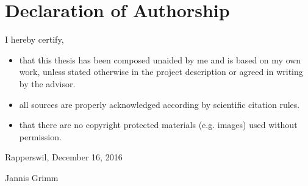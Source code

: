 \chapter{Declaration of Authorship}

I hereby certify,

\begin{itemize}
  \item that this thesis has been composed unaided by me and is based on my own
  work, unless stated otherwise in the project description or agreed in writing by the advisor.
  \item all sources are properly acknowledged according by scientific citation
  rules.
  \item that there are no copyright protected materials (e.g. images) used
  without permission. 
\end{itemize}

\vspace{6ex}

Rapperswil, December 16, 2016

\vspace{11ex}

Jannis Grimm
